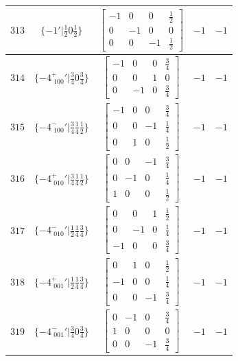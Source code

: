 \documentclass[fleqn,8pt]{jsarticle}
\begin{document}
\begin{longtable}{ccccc}
$ 313 $ & $ \{-1{}'|\frac{1}{2} 0 \frac{1}{2}\} $ & $ \begin{bmatrix} -1 & 0 & 0 & \frac{1}{2} \\ 0 & -1 & 0 & 0 \\ 0 & 0 & -1 & \frac{1}{2} \end{bmatrix} $ & $ -1 $ & $ -1 $ \\ \hline
$ 314 $ & $ \{-4^{+}_{\,\,100}{}'|\frac{3}{4} 0 \frac{3}{4}\} $ & $ \begin{bmatrix} -1 & 0 & 0 & \frac{3}{4} \\ 0 & 0 & 1 & 0 \\ 0 & -1 & 0 & \frac{3}{4} \end{bmatrix} $ & $ -1 $ & $ -1 $ \\ \hline
$ 315 $ & $ \{-4^{-}_{\,\,100}{}'|\frac{3}{4} \frac{1}{4} \frac{1}{2}\} $ & $ \begin{bmatrix} -1 & 0 & 0 & \frac{3}{4} \\ 0 & 0 & -1 & \frac{1}{4} \\ 0 & 1 & 0 & \frac{1}{2} \end{bmatrix} $ & $ -1 $ & $ -1 $ \\ \hline
$ 316 $ & $ \{-4^{+}_{\,\,010}{}'|\frac{3}{4} \frac{1}{4} \frac{1}{2}\} $ & $ \begin{bmatrix} 0 & 0 & -1 & \frac{3}{4} \\ 0 & -1 & 0 & \frac{1}{4} \\ 1 & 0 & 0 & \frac{1}{2} \end{bmatrix} $ & $ -1 $ & $ -1 $ \\ \hline
$ 317 $ & $ \{-4^{-}_{\,\,010}{}'|\frac{1}{2} \frac{1}{4} \frac{3}{4}\} $ & $ \begin{bmatrix} 0 & 0 & 1 & \frac{1}{2} \\ 0 & -1 & 0 & \frac{1}{4} \\ -1 & 0 & 0 & \frac{3}{4} \end{bmatrix} $ & $ -1 $ & $ -1 $ \\ \hline
$ 318 $ & $ \{-4^{+}_{\,\,001}{}'|\frac{1}{2} \frac{1}{4} \frac{3}{4}\} $ & $ \begin{bmatrix} 0 & 1 & 0 & \frac{1}{2} \\ -1 & 0 & 0 & \frac{1}{4} \\ 0 & 0 & -1 & \frac{3}{4} \end{bmatrix} $ & $ -1 $ & $ -1 $ \\ \hline
$ 319 $ & $ \{-4^{-}_{\,\,001}{}'|\frac{3}{4} 0 \frac{3}{4}\} $ & $ \begin{bmatrix} 0 & -1 & 0 & \frac{3}{4} \\ 1 & 0 & 0 & 0 \\ 0 & 0 & -1 & \frac{3}{4} \end{bmatrix} $ & $ -1 $ & $ -1 $ \\ \hline

\end{longtable}
\end{document}
